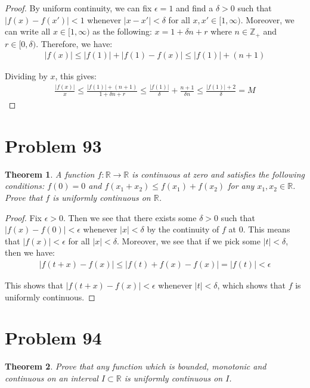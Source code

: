 \documentclass[psamsfonts]{amsart}
\newtheorem{thm}{Theorem}[section]
\theoremstyle{definition}
\theoremstyle{remark}
\numberwithin{equation}{section}
\begin{document}
\begin{proof}
By uniform continuity, we can fix $\epsilon = 1$ and find a $\delta > 0$ such that $|f(x) - f(x')| < 1$ whenever $|x- x'| < \delta$ for all $x,x' \in [1, \infty)$. Moreover, we can write all $x \in [1, \infty)$ as the following: $x = 1 + \delta n + r$ where $n \in \mathbb{Z}_{+}$ and $r \in [0,\delta)$. Therefore, we have:
\begin{eqnarray}
|f(x)| \leq |f(1)| + |f(1) - f(x)| \leq |f(1)| + (n+1) 
\end{eqnarray}

Dividing by $x$, this gives:
\begin{eqnarray}
\frac{|f(x)|}{x} \leq \frac{|f(1)| + (n+1)}{1 + \delta n + r} \leq \frac{|f(1)|}{\delta} + \frac{n+1}{\delta n } \leq \frac{|f(1)| + 2}{\delta} = M 
\end{eqnarray}
\end{proof}

\section{Problem 93}

\begin{thm}
A function $f: \mathbb{R} \to \mathbb{R}$ is continuous at zero and satisfies the following conditions: $f(0) = 0$ and $f(x_1 + x_2) \leq f(x_1) + f(x_2)$ for any $x_1, x_2 \in \mathbb{R}$. Prove that $f$ is uniformly continuous on $\mathbb{R}$. 
\end{thm}

\begin{proof}
Fix $\epsilon > 0$. Then we see that there exists some $\delta > 0$ such that $|f(x) - f(0)| < \epsilon$ whenever $|x| < \delta$ by the continuity of $f$ at $0$. This means that $|f(x)| < \epsilon$ for all $|x| < \delta$. Moreover, we see that if we pick some $|t| < \delta$, then we have:
\begin{eqnarray}
|f(t + x) - f(x)| \leq |f(t) + f(x) - f(x)| = |f(t)| < \epsilon
\end{eqnarray}

This shows that $|f(t + x) - f(x)| < \epsilon$ whenever $|t| < \delta$, which shows that $f$ is uniformly continuous.
\end{proof}

\section{Problem 94}

\begin{thm}
Prove that any function which is bounded, monotonic and continuous on an interval $I \subset \mathbb{R}$ is uniformly continuous on $I$. 
\end{thm}
\end{document}
